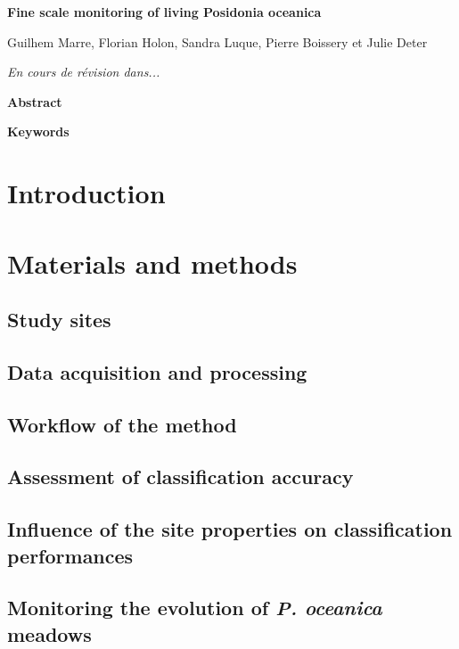 \clearpage

\noindent\textbf{Fine scale monitoring of living Posidonia oceanica}

\noindent Guilhem Marre, Florian Holon, Sandra Luque, Pierre Boissery et Julie Deter

\noindent\textit{En cours de révision dans...}

\noindent\textbf{Abstract}


\noindent\textbf{Keywords}

\section{Introduction}\label{chapitre3_1}

\newpage

\section{Materials and methods}\label{chapitre3_2}

\subsection{Study sites}

\subsection{Data acquisition and processing}

\subsection{Workflow of the method}

\subsection{Assessment of classification accuracy}

\subsection{Influence of the site properties on classification performances}

\subsection{Monitoring the evolution of \textit{P. oceanica} meadows}

